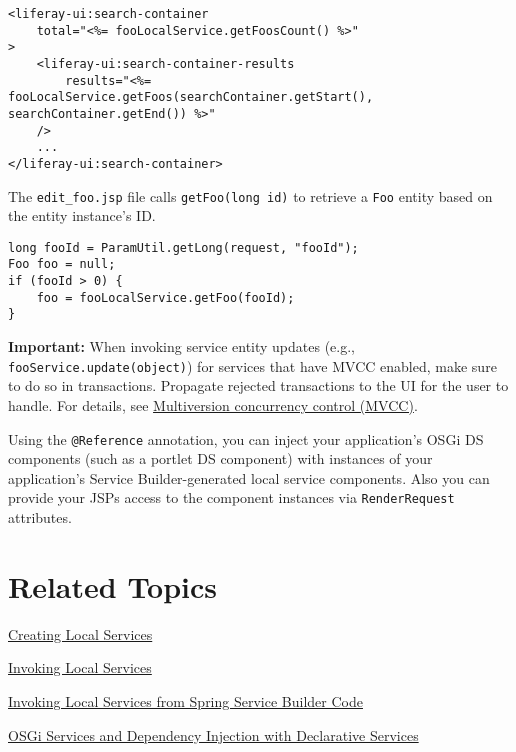 \begin{verbatim}
<liferay-ui:search-container
    total="<%= fooLocalService.getFoosCount() %>"
>
    <liferay-ui:search-container-results
        results="<%= fooLocalService.getFoos(searchContainer.getStart(), searchContainer.getEnd()) %>"
    />
    ...
</liferay-ui:search-container>
\end{verbatim}

The \texttt{edit\_foo.jsp} file calls \texttt{getFoo(long\ id)} to
retrieve a \texttt{Foo} entity based on the entity instance's ID.

\begin{verbatim}
long fooId = ParamUtil.getLong(request, "fooId");
Foo foo = null;
if (fooId > 0) {
    foo = fooLocalService.getFoo(fooId);
}
\end{verbatim}

\noindent\hrulefill

\textbf{Important:} When invoking service entity updates (e.g.,
\texttt{fooService.update(object)}) for services that have MVCC enabled,
make sure to do so in transactions. Propagate rejected transactions to
the UI for the user to handle. For details, see
\href{/docs/7-2/appdev/-/knowledge_base/a/defining-global-service-information\#multiversion-concurrency-control-mvcc}{Multiversion
concurrency control (MVCC)}.

\noindent\hrulefill

Using the \texttt{@Reference} annotation, you can inject your
application's OSGi DS components (such as a portlet DS component) with
instances of your application's Service Builder-generated local service
components. Also you can provide your JSPs access to the component
instances via \texttt{RenderRequest} attributes.

\section{Related Topics}\label{related-topics-21}

\href{/docs/7-2/appdev/-/knowledge_base/a/business-logic-with-service-builder}{Creating
Local Services}

\href{/docs/7-2/appdev/-/knowledge_base/a/invoking-local-services}{Invoking
Local Services}

\href{/docs/7-2/appdev/-/knowledge_base/a/invoking-services-from-spring-service-builder-code}{Invoking
Local Services from Spring Service Builder Code}

\href{/docs/7-2/frameworks/-/knowledge_base/f/declarative-services}{OSGi
Services and Dependency Injection with Declarative Services}


